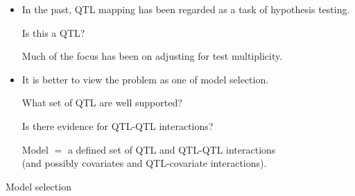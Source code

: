 \documentclass[12pt]{article}
\newcommand{\headsize}{\fontsize{35}{35} \selectfont}
\newcommand{\smallersize}{\fontsize{20}{25} \selectfont}
\begin{document}
\hfill \begin{minipage}[t]{10in}
\begin{itemize}
\itemsep20mm
\item In the past, QTL mapping has been regarded as a task of
  {\color{mypink} hypothesis testing}.

\vspace{10mm}

\hspace{15mm} {\color{myblue} Is this a QTL?}

\vspace{10mm}

Much of the focus has been on adjusting for test multiplicity.

\item It is better to view the problem as one of {\color{mypink} model
  selection}.

\vspace{10mm}

\hspace{15mm} {\color{myblue} What set of QTL are well supported?}

\hspace{15mm} {\color{myblue} Is there evidence for QTL-QTL
  interactions?}

\vspace{10mm}

{\color{mypink} Model} $\mathsf{=}$ a defined set of QTL and QTL-QTL interactions
\\
(and possibly covariates and QTL-covariate interactions).

\end{itemize}
\end{minipage}

\newpage

\headsize \color{myyellow}
\hfill \begin{minipage}{5.75in}
\centering
Model selection
\end{minipage}

\vspace{15mm} \color{mywhite} \smallersize
\end{document}
